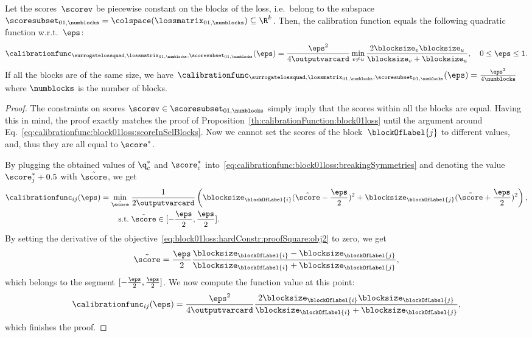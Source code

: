 \documentclass{article}
\begin{document}
\begin{proposition}
    \label{th:calibrationFunction:block01loss:hardConstr}
    Let the scores~$\scorev$ be piecewise constant on the blocks of the loss, i.e.\ belong to the subspace~$\scoresubset_{01,\numblocks} = \colspace(\lossmatrix_{01,\numblocks}) \subseteq \R^k$.
    Then, the calibration function equals the following quadratic function w.r.t.\ $\eps$:
    \[
    \calibrationfunc_{\surrogatelossquad,\lossmatrix_{01,\numblocks},\scoresubset_{01,\numblocks}}(\eps)
    =
    \frac{\eps^2}{4\outputvarcard} \min_{v \neq u} \frac{2 \blocksize_v \blocksize_u}{\blocksize_v + \blocksize_u},
    \quad 0 \leq \eps \leq 1.
    \]
    If all the blocks are of the same size, we have
    $
    \calibrationfunc_{\surrogatelossquad,\lossmatrix_{01,\numblocks},\scoresubset_{01,\numblocks}}(\eps)
    =
    \frac{\eps^2}{4\numblocks}
    $
    where $\numblocks$ is the number of blocks.
\end{proposition}
\begin{proof}
    The constraints on scores $\scorev \in \scoresubset_{01,\numblocks}$ simply imply that the scores within all the blocks are equal.
    Having this in mind, the proof exactly matches the proof of Proposition~\ref{th:calibrationFunction:block01loss} until the argument around Eq.~\eqref{eq:calibrationfunc:block01loss:scoreInSelBlocks}.
    Now we cannot set the scores of the block~$\blockOfLabel{j}$ to different values, and, thus they are all equal to $\score^*$.
    
    By plugging the obtained values of $\q_c^*$ and $\score_c^*$ into~\eqref{eq:calibrationfunc:block01loss:breakingSymmetries} and denoting the value $\score_{j}^* + 0.5$ with $\tilde{\score}$, we get
    \begin{align}
    \notag
    \calibrationfunc_{ij}(\eps) = \min_{\tilde{\score}} \; &\frac{1}{2\outputvarcard}  \left( \blocksize_{\blockOfLabel{i}} (\tilde{\score} - \frac{\eps}{2})^2 + \blocksize_{\blockOfLabel{j}} (\tilde{\score} + \frac{\eps}{2})^2 \right),\\
    \label{eq:block01loss:hardConstr:proofSquare:obj2}
    \mbox{s.t.}\; & \tilde{\score} \in [-\frac{\eps}{2}, \frac{\eps}{2}].
    \end{align}
    By setting the derivative of the objective~\eqref{eq:block01loss:hardConstr:proofSquare:obj2} to zero, we get
    $$
    \tilde{\score} = \frac{\eps}{2} \frac{\blocksize_{\blockOfLabel{i}} - \blocksize_{\blockOfLabel{j}}}{\blocksize_{\blockOfLabel{i}} + \blocksize_{\blockOfLabel{j}}},
    $$
    which belongs to the segment $[-\frac{\eps}{2}, \frac{\eps}{2}]$.
    We now compute the function value at this point:
    $$
    \calibrationfunc_{ij} (\eps) = \frac{\eps^2}{4\outputvarcard} \frac{2\blocksize_{\blockOfLabel{i}}\blocksize_{\blockOfLabel{j}}}{\blocksize_{\blockOfLabel{i}}+\blocksize_{\blockOfLabel{j}}},
    $$
    which finishes the proof.
\end{proof}
\end{document}
